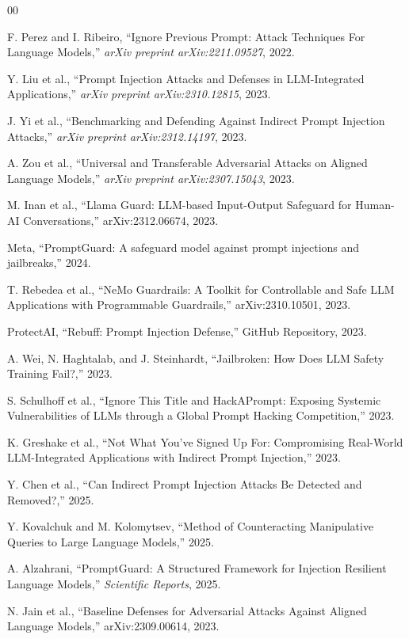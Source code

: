 \documentclass[conference]{IEEEtran}
\begin{document}
\begin{thebibliography}{00}

F. Perez and I. Ribeiro, ``Ignore Previous Prompt: Attack Techniques For Language Models,'' \textit{arXiv preprint arXiv:2211.09527}, 2022.

Y. Liu et al., ``Prompt Injection Attacks and Defenses in LLM-Integrated Applications,'' \textit{arXiv preprint arXiv:2310.12815}, 2023.

J. Yi et al., ``Benchmarking and Defending Against Indirect Prompt Injection Attacks,'' \textit{arXiv preprint arXiv:2312.14197}, 2023.

A. Zou et al., ``Universal and Transferable Adversarial Attacks on Aligned Language Models,'' \textit{arXiv preprint arXiv:2307.15043}, 2023.

M. Inan et al., ``Llama Guard: LLM-based Input-Output Safeguard for Human-AI Conversations,'' arXiv:2312.06674, 2023.

Meta, ``PromptGuard: A safeguard model against prompt injections and jailbreaks,'' 2024.

T. Rebedea et al., ``NeMo Guardrails: A Toolkit for Controllable and Safe LLM Applications with Programmable Guardrails,'' arXiv:2310.10501, 2023.

ProtectAI, ``Rebuff: Prompt Injection Defense,'' GitHub Repository, 2023.

A. Wei, N. Haghtalab, and J. Steinhardt, ``Jailbroken: How Does LLM Safety Training Fail?,'' 2023.

S. Schulhoff et al., ``Ignore This Title and HackAPrompt: Exposing Systemic Vulnerabilities of LLMs through a Global Prompt Hacking Competition,'' 2023.

K. Greshake et al., ``Not What You've Signed Up For: Compromising Real-World LLM-Integrated Applications with Indirect Prompt Injection,'' 2023.

Y. Chen et al., ``Can Indirect Prompt Injection Attacks Be Detected and Removed?,'' 2025.

Y. Kovalchuk and M. Kolomytsev, ``Method of Counteracting Manipulative Queries to Large Language Models,'' 2025.

A. Alzahrani, ``PromptGuard: A Structured Framework for Injection Resilient Language Models,'' \textit{Scientific Reports}, 2025.

N. Jain et al., ``Baseline Defenses for Adversarial Attacks Against Aligned Language Models,'' arXiv:2309.00614, 2023.
\end{thebibliography}
\end{document}
